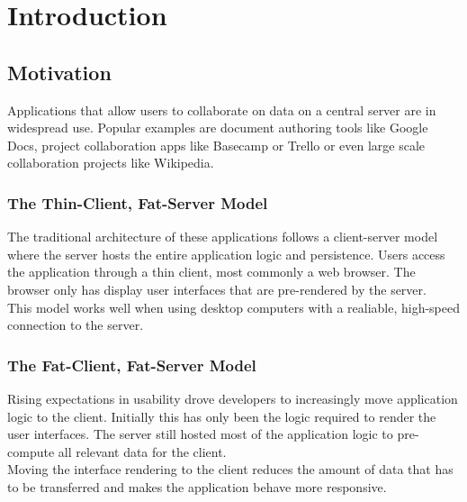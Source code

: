 
\chapter{Introduction}\label{intro}

\section{Motivation}
Applications that allow users to collaborate on data on a central server are in widespread use. Popular examples are document authoring tools like Google Docs, project collaboration apps like Basecamp or Trello or even large scale collaboration projects like Wikipedia.\\
\subsection{The Thin-Client, Fat-Server Model}
The traditional architecture of these applications follows a client-server model where the server hosts the entire application logic and persistence. Users access the application through a thin client, most commonly a web browser. The browser only has display user interfaces that are pre-rendered by the server.\\
This model works well when using desktop computers with a realiable, high-speed connection to the server.\\

\subsection{The Fat-Client, Fat-Server Model}
Rising expectations in usability drove developers to increasingly move application logic to the client. Initially this has only been the logic required to render the user interfaces. The server still hosted most of the application logic to pre-compute all relevant data for the client.\\
Moving the interface rendering to the client reduces the amount of data that has to be transferred and makes the application behave more responsive.

